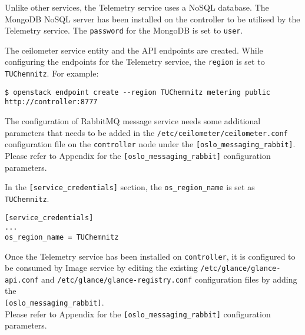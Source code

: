 Unlike other services, the Telemetry service uses a NoSQL database.
The MongoDB NoSQL server has been installed on the controller to be utilised by the Telemetry service.
The \verb|password| for the MongoDB is set to \verb|user|.

The ceilometer service entity and the API endpoints are created.
While configuring the endpoints for the Telemetry service, the \verb|region| is set to \verb|TUChemnitz|.
For example:
\begin{lstlisting}[frame=single]
$ openstack endpoint create --region TUChemnitz metering public http://controller:8777
\end{lstlisting}


The configuration of RabbitMQ message service needs some additional parameters that needs to be added in the \verb|/etc/ceilometer/ceilometer.conf| configuration file on the \verb|controller| node under the \verb|[oslo_messaging_rabbit]|.
\\Please refer to Appendix  for the \verb|[oslo_messaging_rabbit]| configuration parameters.

In the \verb|[service_credentials]| section, the \verb|os_region_name| is set as \verb|TUChemnitz|.
\begin{lstlisting}[frame=single]
[service_credentials]
...
os_region_name = TUChemnitz
\end{lstlisting}

Once the Telemetry service has been installed on \verb|controller|, it is configured to be consumed by Image service by editing the existing \verb|/etc/glance/glance-api.conf| and \verb|/etc/glance/glance-registry.conf| configuration files by adding the \\\verb|[oslo_messaging_rabbit]|.
\\Please refer to Appendix  for the \verb|[oslo_messaging_rabbit]| configuration parameters.


